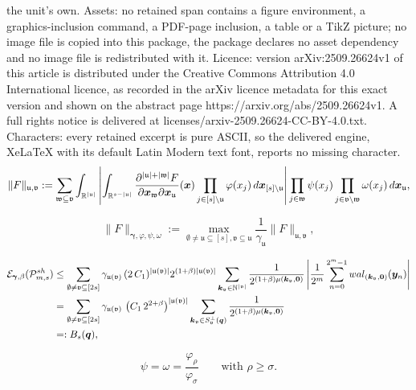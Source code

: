 \documentclass[10pt,a4paper]{amsart}
\newcommand{\bsgamma}{\boldsymbol{\gamma}}
\newcommand{\bsk}{\boldsymbol{k}}
\newcommand{\bsq}{\boldsymbol{q}}
\newcommand{\bsx}{\boldsymbol{x}}
\newcommand{\bsy}{\boldsymbol{y}}
\newcommand{\bszero}{\boldsymbol{0}}
\newcommand{\cP}{\mathcal{P}}
\newcommand{\rd}{\, {\rm d}}
\newcommand{\uu}{\mathfrak{u}}
\newcommand{\vv}{\mathfrak{v}}
\newcommand{\wal}{{\rm wal}}
\newcommand{\ww}{\mathfrak{w}}
\begin{document}
the unit's own. Assets: no retained span contains a figure environment, a graphics-inclusion command, a PDF-page inclusion, a table or a TikZ picture; no image file is copied into this package, the package declares no asset dependency and no image file is redistributed with it. Licence: version arXiv:2509.26624v1 of this article is distributed under the Creative Commons Attribution 4.0 International licence, as recorded in the arXiv licence metadata for this exact version and shown on the abstract page https://arxiv.org/abs/2509.26624v1. A full rights notice is delivered at licenses/arxiv-2509.26624-CC-BY-4.0.txt. Characters: every retained excerpt is pure ASCII, so the delivered engine, XeLaTeX with its default Latin Modern text font, reports no missing character.
\begin{equation}\label{eq_uvnorm}
\|F\|_{\uu, \vv} :=  \sum_{\ww \subseteq \vv} \int_{\mathbb{R}^{|\uu|}} \left| \int_{\mathbb{R}^{s-|\uu|}} \frac{\partial^{|\uu| + |\ww|} F}{\partial \bsx_\ww \partial \bsx_{\uu}}(\bsx)\prod_{j \in [s]\setminus \uu} \varphi(x_j) \rd \bsx_{[s] \setminus \uu} \right|   \prod_{j \in \ww} \psi(x_j) \prod_{j \in \vv \setminus \ww} \omega(x_j)    \rd \bsx_{\uu},  
\end{equation}

\begin{equation}\label{Fnorm:infty}
 \|F\|_{\bsgamma,\varphi,\psi,\omega} := \max_{\emptyset \not= \uu \subseteq [s], \vv \subseteq \uu} \frac{1}{\gamma_{\uu}} \|F\|_{\uu, \vv},
\end{equation}

\begin{align}\label{eq:EBsq}
\mathcal{E}_{\bsgamma,\beta}(\cP_{m,s}^{{\rm sh}})
& \le  \sum_{\emptyset \not= \vv \subseteq [2s]} \gamma_{\uu(\vv)} \, (2 \, C_1)^{|\uu(\vv)|}  2^{(1+\beta) |\uu(\vv)|} \sum_{\bsk_\vv \in \mathbb{N}^{|\vv|}} \frac{1}{2^{(1+\beta) \mu(\bsk_{\vv},\bszero)}}  \left|\frac{1}{2^m} \sum_{n=0}^{2^m-1} \wal_{(\bsk_\vv,\bszero)}(\bsy_n)\right| \nonumber\\  
& = \sum_{\emptyset \not= \vv \subseteq [2s]} \gamma_{\uu(\vv)} \, \left(C_1 \, 2^{2+\beta}\right)^{|\uu(\vv)|} \sum_{\bsk_\vv \in S^\perp_{\vv}(\bsq)} \frac{1}{2^{(1+\beta) \mu(\bsk_{\vv}, \bszero)}}\\
& = : B_s(\bsq),\nonumber
\end{align}

\begin{equation}\label{eq_psi_1}
\psi=\omega=\frac{\varphi_\rho}{\varphi_\sigma}\qquad \mbox{with $\rho\ge \sigma$.} 
\end{equation}
\end{document}
